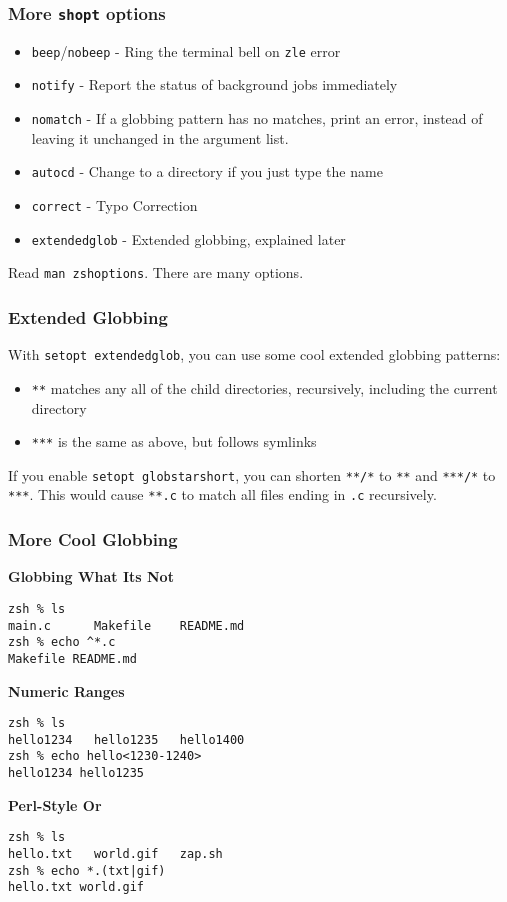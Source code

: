 \documentclass{beamer}
\begin{document}
\begin{frame}
    \frametitle{More \texttt{shopt} options}
    \begin{itemize}
        \item \texttt{beep}/\texttt{nobeep} - Ring the terminal bell on \texttt{zle} error
        \item \texttt{notify} - Report the status of background jobs
            immediately
        \item \texttt{nomatch} - If a globbing pattern has no matches, print an
            error, instead of leaving it unchanged in the argument list.
        \item \texttt{autocd} - Change to a directory if you just type the name
        \item \texttt{correct} - Typo Correction
        \item \texttt{extendedglob} - Extended globbing, explained later
    \end{itemize}

    Read \texttt{man zshoptions}. There are many options.

\end{frame}

\begin{frame}
    \frametitle{Extended Globbing}
    With \texttt{setopt extendedglob}, you can use some cool extended globbing
    patterns:
    \begin{itemize}
        \item \texttt{**} matches any all of the child directories,
            recursively, including the current directory
        \item \texttt{***} is the same as above, but follows symlinks
    \end{itemize}

    If you enable \texttt{setopt globstarshort}, you can shorten \texttt{**/*}
    to \texttt{**} and \texttt{***/*} to \texttt{***}. This would cause
    \texttt{**.c} to match all files ending in \texttt{.c} recursively.
\end{frame}

\begin{frame}[fragile]
    \frametitle{More Cool Globbing}
    \textbf{Globbing What Its Not}
    \begin{verbatim}
zsh % ls
main.c      Makefile    README.md
zsh % echo ^*.c
Makefile README.md\end{verbatim}
    \pause

    \vfill
    \textbf{Numeric Ranges}
    \begin{verbatim}
zsh % ls
hello1234   hello1235   hello1400
zsh % echo hello<1230-1240>
hello1234 hello1235\end{verbatim}
    \pause

    \vfill
    \textbf{Perl-Style Or}
    \begin{verbatim}
zsh % ls
hello.txt   world.gif   zap.sh
zsh % echo *.(txt|gif)
hello.txt world.gif\end{verbatim}
\end{frame}
\end{document}
